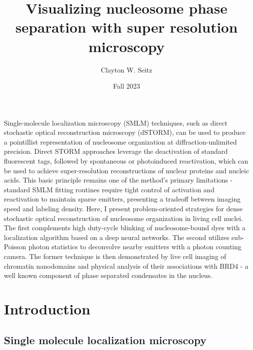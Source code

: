 \documentclass{ucetd}
\title{Visualizing nucleosome phase separation with super resolution microscopy}
\author{Clayton W. Seitz}
\date{Fall 2023}
\begin{document}
\maketitle



\tableofcontents


\abstract

Single-molecule localization microscopy (SMLM) techniques, such as direct stochastic optical reconstruction microscopy (dSTORM), can be used to produce a pointillist representation of nucleosome organization at diffraction-unlimited precision. Direct STORM approaches leverage the deactivation of standard fluorescent tags, followed by spontaneous or photoinduced reactivation, which can be used to achieve super-resolution reconstructions of nuclear proteins and nucleic acids. This basic principle remains one of the method's primary limitations - standard SMLM fitting routines require tight control of activation and reactivation to maintain sparse emitters, presenting a tradeoff between imaging speed and labeling density. Here, I present problem-oriented strategies for dense stochastic optical reconstruction of nucleosome organization in living cell nuclei. The first complements high duty-cycle blinking of nucleosome-bound dyes with a localization algorithm based on a deep neural networks. The second utilizes sub-Poisson photon statistics to deconvolve nearby emitters with a photon counting camera. The former technique is then demonstrated by live cell imaging of chromatin nanodomains and physical analysis of their associations with BRD4 - a well known component of phase separated condensates in the nucleus. 


\clearpage

\mainmatter



\section{Introduction}

\subsection{Single molecule localization microscopy}
\end{document}
